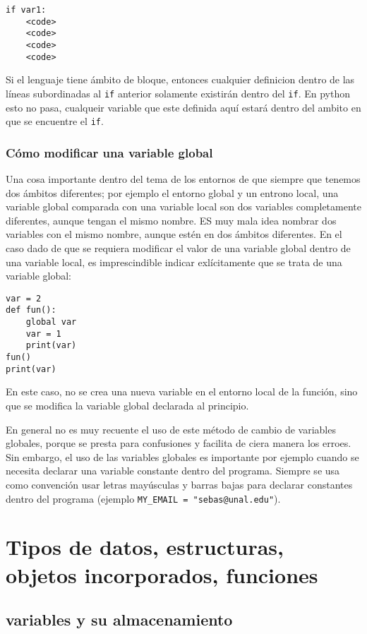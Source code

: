 \begin{verbatim}
if var1:
    <code>
    <code>
    <code>
    <code>
\end{verbatim}

Si el lenguaje tiene ámbito de bloque, entonces cualquier definicion dentro de las líneas subordinadas al \texttt{if} anterior solamente existirán dentro del \texttt{if}. En python esto no pasa, cualqueir variable que este definida aquí estará dentro del ambito en que se encuentre el \texttt{if}.

\subsubsection{Cómo modificar una variable global}

Una cosa importante dentro del tema de los entornos de que siempre que tenemos dos ámbitos diferentes; por ejemplo el entorno global y un entrono local, una variable global comparada con una variable local son dos variables completamente diferentes, aunque tengan el mismo nombre. ES muy mala idea nombrar dos variables con el mismo nombre, aunque estén en dos ámbitos diferentes. En el caso dado de que se requiera modificar el valor de una variable global dentro de una variable local, es imprescindible indicar exlícitamente que se trata de una variable global:

\begin{verbatim}
var = 2
def fun():
    global var
    var = 1
    print(var)
fun()
print(var)
\end{verbatim}

En este caso, no se crea una nueva variable en el entorno local de la función, sino que se modifica la variable global declarada al principio.

En general no es muy recuente el uso de este método de cambio de variables globales, porque se presta para confusiones y facilita de ciera manera los erroes. Sin embargo, el uso de las variables globales es importante por ejemplo cuando se necesita declarar una variable constante dentro del programa. Siempre se usa como convención usar letras mayúsculas y barras bajas para declarar constantes dentro del programa (ejemplo \texttt{MY\_EMAIL = "sebas@unal.edu"}).

\section{Tipos de datos, estructuras, objetos incorporados, funciones}

\subsection{variables y su almacenamiento}

